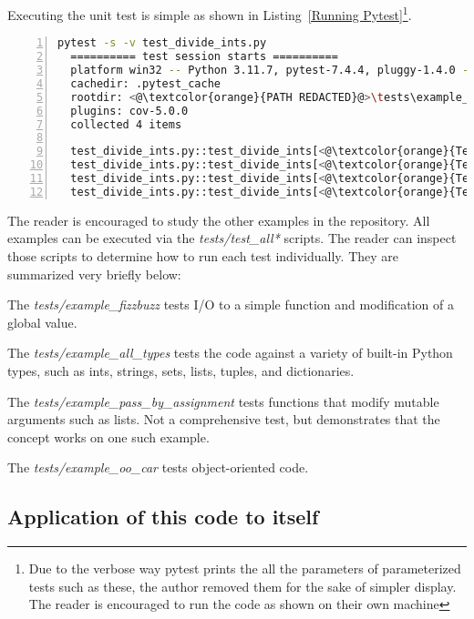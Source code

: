 \documentclass[10pt, conference]{IEEEtran}
\begin{document}
Executing the unit test is simple as shown in Listing~\ref{Running Pytest}\footnote{Due to the verbose way pytest prints the 
all the parameters of  parameterized tests such as these, the author removed
them for the sake of simpler display.  The reader is encouraged to run the code 
as shown on their own machine}.


\begin{lstlisting}[language=bash, numbers=left, caption={Running Pytest}, label={Running Pytest}]
  pytest -s -v test_divide_ints.py
  ========== test session starts ==========
  platform win32 -- Python 3.11.7, pytest-7.4.4, pluggy-1.4.0 -- <@\textcolor{orange}{PATH REDACTED}@>\.venv\Scripts\python.exe
  cachedir: .pytest_cache
  rootdir: <@\textcolor{orange}{PATH REDACTED}@>\tests\example_procedural_division
  plugins: cov-5.0.0
  collected 4 items
  
  test_divide_ints.py::test_divide_ints[<@\textcolor{orange}{Test \#1 arguments SNIPPED}@>] <@\textcolor{green}{PASSED}@>
  test_divide_ints.py::test_divide_ints[<@\textcolor{orange}{Test \#2 arguments SNIPPED}@>] <@\textcolor{green}{PASSED}@>
  test_divide_ints.py::test_divide_ints[<@\textcolor{orange}{Test \#3 arguments SNIPPED}@>] <@\textcolor{green}{PASSED}@>
  test_divide_ints.py::test_divide_ints[<@\textcolor{orange}{Test \#4 arguments SNIPPED}@>] <@\textcolor{green}{PASSED}@>
  \end{lstlisting}




The reader is encouraged to study the other examples in the repository.
All examples can be executed via the 
\textit{tests/test\_all*} scripts.  The reader can inspect those scripts
to determine how to run each test individually. 
They are summarized very briefly below:

The \textit{tests/example\_fizzbuzz} tests I/O to a simple function and modification of a 
global value.

The \textit{tests/example\_all\_types} tests
the code against a variety of built-in Python types, 
such as ints, strings, sets, lists, tuples, and dictionaries.

The \textit{tests/example\_pass\_by\_assignment} tests
functions that modify mutable arguments such as lists. Not a comprehensive test,
but demonstrates that the concept works on one such example.

The \textit{tests/example\_oo\_car} tests object-oriented code. 
\subsection{Application of this code to itself}\label{sec:eval-2}
\end{document}

